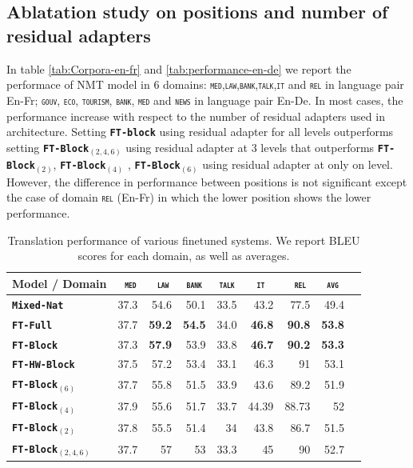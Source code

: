 \documentclass[11pt,a4paper]{article}
\newcommand{\fyDone}[1]{\done[FY]\Todo[FY:]{\textcolor{orange}{#1}}}
\newcommand{\domain}[1]{\texttt{\textsc{#1}}}
\newcommand{\system}[1]{\texttt{\textbf{#1}}}
\newcommand{\SB}[1]{\textbf{#1}}
\begin{document}
\subsection{Ablatation study on positions and number of residual adapters}

In table \ref{tab:Corpora-en-fr} and \ref{tab:performance-en-de} we report the performace of NMT model in 6 domains: \domain{med},\domain{law},\domain{bank},\domain{talk},\domain{it} and \domain{rel} in language pair En-Fr; \domain{gouv}, \domain{eco}, \domain{tourism}, \domain{bank}, \domain{med} and \domain{news} in language pair En-De. In most cases, the performance increase with respect to the number of residual adapters used in architecture. Setting \system{FT-block} using residual adapter for all levels outperforms setting \system{FT-Block$_{(2,4,6)}$} using residual adapter at 3 levels that outperforms \system{FT-Block$_{(2)}$}, \system{FT-Block$_{(4)}$} , \system{FT-Block$_{(6)}$} using residual adapter at only on level. However, the difference in performance between positions is not significant except the case of domain \domain{rel} (En-Fr) in which the lower position shows the lower performance.   
\begin{table}
  \centering
  \fyDone{Fix column size}
  \begin{tabular}{|p{3cm}|*{8}{r|}} \hline
    Model / Domain & \multicolumn{1}{c|}{\domain{ med}} & \multicolumn{1}{c|}{\domain{ law}} & \multicolumn{1}{c|}{\domain{bank}} & \multicolumn{1}{c|}{\domain{talk}} & \multicolumn{1}{c|}{\domain{ it }} & \multicolumn{1}{c|}{\domain{ rel}} & \multicolumn{1}{c|}{\domain{avg}} \\ \hline %
    \system{Mixed-Nat}  & 37.3 & 54.6 & 50.1 & 33.5 & 43.2 & 77.5  & 49.4 \\
    \system{FT-Full}       & 37.7 & \SB{59.2} & \SB{54.5} & 34.0 & \SB{46.8} & \SB{90.8} & \SB{53.8} \\
   \system{FT-Block}     & 37.3 & \SB{57.9} & 53.9 & 33.8 & \SB{46.7} & \SB{90.2} & \SB{53.3} \\ 
   \system{FT-HW-Block}   & 37.5 & 57.2 & 53.4 & 33.1 & 46.3 & 91 & 53.1 \\ 
   \system{FT-Block$_{(6)}$}     & 37.7 & 55.8 & 51.5 & 33.9 & 43.6 & 89.2 & 51.9 \\
   \system{FT-Block$_{(4)}$}     & 37.9 & 55.6 & 51.7 & 33.7 & 44.39 & 88.73 & 52 \\
   \system{FT-Block$_{(2)}$}     & 37.8 & 55.5 & 51.4 & 34 & 43.8 & 86.7 & 51.5 \\
   \system{FT-Block$_{(2,4,6)}$}     & 37.7 & 57 & 53 & 33.3 & 45 & 90 & 52.7 \\
     \hline
  \end{tabular}
  \caption{Translation performance of various finetuned systems. We report BLEU scores for each domain, as well as averages.}
  \label{tab:performance-en-fr}
\end{table}
\end{document}
